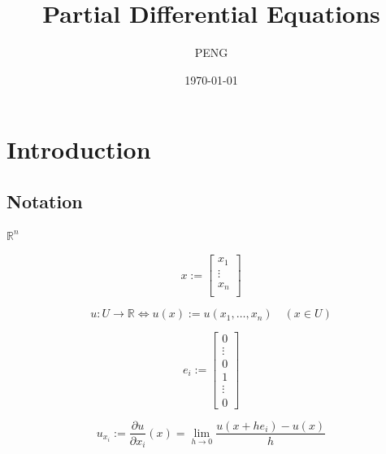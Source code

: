 \documentclass{article}
\title{Partial Differential Equations}
\author{PENG}
\date{\today}
\begin{document}
\maketitle
\tableofcontents

\section{Introduction}
\subsection{Notation}
\begin{definition}
    $\mathbb{R}^{n}$
\end{definition}

\begin{definition}
    \begin{equation}
        \label{eq:x}
        x :=
        \begin{bmatrix}
            x_{1} \\ \vdots \\ x_{n}  \\
        \end{bmatrix}
    \end{equation}
\end{definition}

\begin{definition}[$u(x)$]
    \begin{equation}
        \label{eq:u}
        u : U \to \mathbb{R} \Leftrightarrow u(x) := u(x_{1}, \ldots, x_{n}) \quad (x \in U)
    \end{equation}
\end{definition}

\begin{definition}
    \begin{equation}
        \label{eq:ei}
        e_{i} :=
        \begin{bmatrix}
            0 \\ \vdots \\ 0 \\ 1 \\ \vdots \\ 0
        \end{bmatrix}
    \end{equation}
\end{definition}

\begin{definition}[derivative]
    \begin{equation}
        \label{eq:derivative}
        u_{x_{i}} := \frac{\partial u}{\partial x_{i}}(x) = \lim_{h \to 0} \frac{u(x+he_{i}) - u(x)}{h}
    \end{equation}
\end{definition}
\end{document}
